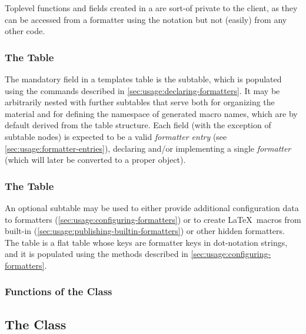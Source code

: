 \documentclass[12pt]{scrartcl}
\begin{document}
Toplevel functions and fields created in a  are sort-of
private to the client, as they can be accessed from a formatter using the
 notation but not (easily) from any other code.

\subsubsection{The  Table}
\label{sec:advanced:the-formatter-table}

The mandatory field in a templates table is the  subtable,
which is populated using the commands described in
\vref{sec:usage:declaring-formatters}. It may be arbitrarily nested with further
subtables that serve both for organizing the material and for defining the
namespace of generated macro names, which are by default derived from the table
structure.  Each field (with the exception of subtable nodes) is expected to be
a valid \emph{formatter entry} (see \vref{sec:usage:formatter-entries}),
declaring and/or implementing a single \emph{formatter} (which will later be
converted to a proper  object).


\subsubsection{The  Table}
\label{sec:advanced:the-configuration-table}

An optional subtable  may be used to either provide
additional configuration data to formatters
(\vref{sec:usage:configuring-formatters}) or to create \LaTeX\ macros from
built-in (\vref{sec:usage:publishing-builtin-formatters}) or other hidden
formatters.  The table is a flat table whose keys are formatter keys in
dot-notation strings, and it is populated using the methods described in
\vref{sec:usage:configuring-formatters}.


\subsubsection{Functions of the  Class}
\label{sec:advanced:templates-table-functions}



\subsection{The  Class}
\label{sec:advanced:the-formatter-class}
\end{document}
